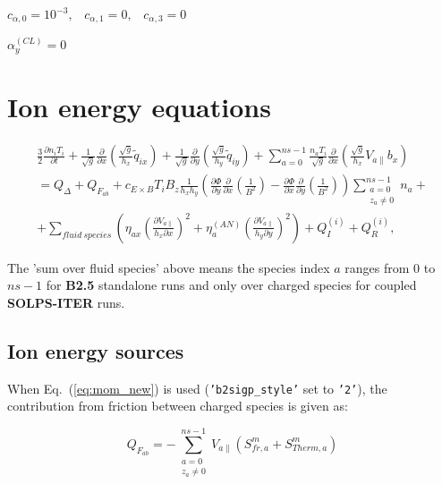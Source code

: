 \documentclass[a4paper,10pt]{report}
\newcommand\SOLPSITER{{\bf SOLPS-ITER} }
\begin{document}
$c_{\alpha,0} = 10^{-3}, \;\;\; c_{\alpha,1} = 0,\;\;\; c_{\alpha,3} = 0$

$\alpha^{(CL)}_{y} = 0$

\section{Ion energy equations}

\begin{equation}
\begin{matrix}
\frac{3}{2} \frac{\partial n_i T_i}{\partial t} + \frac{1}{\sqrt g} \frac{\partial}{\partial x} \left(
	\frac{\sqrt g}{h_x} \widetilde q_{ix}
\right)  + \frac{1}{\sqrt g} \frac{\partial}{\partial y} \left(
	\frac{\sqrt g}{h_y} \widetilde q_{iy}
\right) + \sum \limits^{ns-1}_{a = 0} \frac{n_a T_i}{\sqrt{g}} \frac{\partial}{\partial x} \left(
	\frac{\sqrt g}{h_x} V_{a \parallel} b_x
\right)
\\
= Q_{\Delta} + Q_{F_{ab}} +  c_{E \times B} T_i B_z \frac{1}{h_x h_y} \left(
	\frac{\partial \Phi}{\partial y} \frac{\partial}{\partial x} \left(
		\frac{1}{B^2}
	\right) -
	\frac{\partial \Phi}{\partial x} \frac{\partial}{\partial y} \left(
		\frac{1}{B^2}
	\right)
\right)
\sum \limits^{ns-1}_{\substack{a = 0 \\ z_a \neq 0}} n_a +
\\
+ \sum \limits_{fluid~species} \left(
	  \eta_{ax} \left(
		\frac{\partial V_{a \parallel}}{h_x \partial x}
	\right)^2
	+ \eta^{(AN)}_{a} \left(
		\frac{\partial V_{a \parallel}}{h_y \partial y}
	\right)^2
\right) + Q_I^{(i)} + Q_R^{(i)},
\end{matrix}
\end{equation}

The 'sum over fluid species' above means the species index $a$ ranges from $0$ to $ns - 1$ for {\bf B2.5} standalone runs and only over charged species for coupled \SOLPSITER runs.

\subsection{Ion energy sources}

When Eq.~(\ref{eq:mom_new}) is used ({\tt 'b2sigp\_style'} set to {\tt '2'}), the contribution from friction between charged species is given as:

\begin{equation*}
Q_{F_{ab}} = - \sum \limits_{\substack{a=0 \\ z_a \neq 0}}^{ns - 1} V_{a \parallel} \left( S^m_{fr,a} + S^m_{Therm,a} \right)
\end{equation*}
\end{document}
